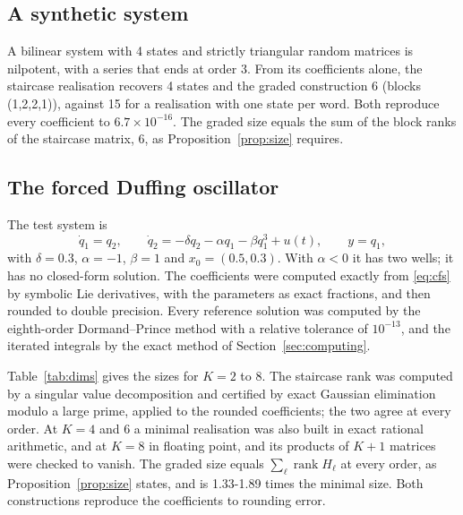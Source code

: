\documentclass[11pt,a4paper]{article}
\theoremstyle{remark}
\begin{document}
\subsection{A synthetic system}
A bilinear system with 4 states and strictly triangular random matrices is nilpotent, with a series that ends at order 3.
From its coefficients alone, the staircase realisation recovers 4 states and the graded construction 6 (blocks (1,2,2,1)), against 15 for a realisation with one state per word.
Both reproduce every coefficient to $6.7\times10^{-16}$.
The graded size equals the sum of the block ranks of the staircase matrix, 6, as Proposition~\ref{prop:size} requires.

\subsection{The forced Duffing oscillator}
The test system is
\begin{equation}\label{eq:duffing}
\dot q_1=q_2,\qquad \dot q_2=-\delta q_2-\alpha q_1-\beta q_1^3+u(t),\qquad y=q_1,
\end{equation}
with $\delta=0.3$, $\alpha=-1$, $\beta=1$ and $x_0=(0.5,0.3)$.
With $\alpha<0$ it has two wells; it has no closed-form solution.
The coefficients were computed exactly from \eqref{eq:cfs} by symbolic Lie derivatives, with the parameters as exact fractions, and then rounded to double precision.
Every reference solution was computed by the eighth-order Dormand--Prince method with a relative tolerance of $10^{-13}$, and the iterated integrals by the exact method of Section~\ref{sec:computing}.

Table~\ref{tab:dims} gives the sizes for $K=2$ to $8$.
The staircase rank was computed by a singular value decomposition and certified by exact Gaussian elimination modulo a large prime, applied to the rounded coefficients; the two agree at every order.
At $K=4$ and $6$ a minimal realisation was also built in exact rational arithmetic, and at $K=8$ in floating point, and its products of $K+1$ matrices were checked to vanish.
The graded size equals $\sum_\ell\operatorname{rank}H_\ell$ at every order, as Proposition~\ref{prop:size} states, and is 1.33-1.89 times the minimal size.
Both constructions reproduce the coefficients to rounding error.
\end{document}

